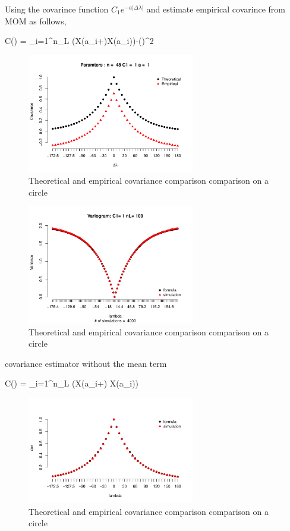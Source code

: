 Using the covarince function $C_1e^{-a|\Delta\lambda|}$ and estimate empirical covarince from MOM as follows,

\beq\label{cov:circle1}
C(\theta) =  \sum_{i=1}^{n_L} (X(a_i+\theta)\cdot X(a_i))-()^2
\eeq


\begin{figure}
	\centering
	\includegraphics[width=0.65\textwidth]{graphs/covarince_circle}
	\caption {Theoretical and empirical covariance comparison comparison on a circle}
\end{figure}


\begin{figure}
	\centering
	\includegraphics[width=0.65\textwidth]{graphs/variogram_plot_4000}
	\caption {Theoretical and empirical covariance comparison comparison on a circle}
\end{figure}

covariance estimator without the mean term

\beq \label{cov:circle1}  
C(\theta) =  \sum_{i=1}^{n_L} (X(a_i+\theta) \cdot X(a_i)) 
\eeq

\begin{figure}
	\centering
	\includegraphics[width=0.65\textwidth]{graphs/Summary-covarince_circle_2}
	\caption {Theoretical and empirical covariance comparison comparison on a circle}
\end{figure}